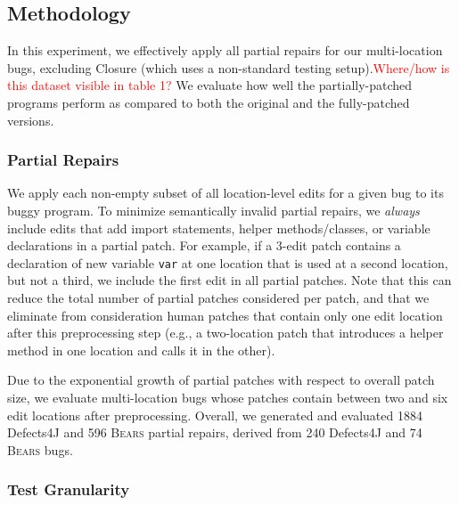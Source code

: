 \documentclass[10pt, conference]{IEEEtran}
\newcommand\todo[1]{\textcolor{red}{#1}}
\newcommand\bears{\textsc{Bears}\xspace}
\begin{document}
\subsection{Methodology}
\label{sec:partial-repair-methodology}

In this experiment, we effectively apply all partial repairs for our
multi-location bugs, excluding Closure (which uses a non-standard testing
setup).\todo{Where/how is this dataset visible in table 1?} We 
evaluate how well the partially-patched programs perform 
as compared to both the original and the fully-patched versions. 

\subsubsection{Partial Repairs}
We apply each non-empty subset of all location-level edits for a given bug to
its buggy program.  To minimize semantically invalid partial repairs, we \emph{always}
include edits that add import statements, helper methods/classes, or variable declarations
in a partial patch. 
For example, if a 3-edit patch contains a declaration of new variable
\texttt{var} at one location that is used at a second location, but not a third,
we include the first edit in all partial patches.  Note that this can reduce the total
number of partial patches considered per patch, and that we eliminate from
consideration human patches that contain only 
one edit location after this preprocessing step (e.g., a two-location patch that introduces a
helper method in one location and calls it in the other).  

Due to the exponential growth of partial patches with respect to overall patch size,
we evaluate multi-location bugs whose patches 
contain between two and six edit locations after preprocessing.
Overall, we generated and evaluated 1884 Defects4J and 596 \bears partial repairs,
derived from 240 Defects4J and 74 \bears bugs.

\subsubsection{Test Granularity}
\end{document}
